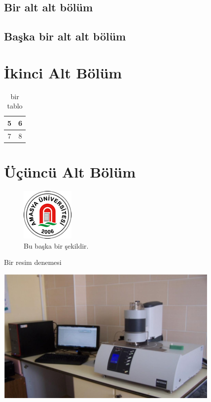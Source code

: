 \documentclass[
oneside, %
doktora, %
]{aufbetez} %
\begin{document}
\subsection{Bir alt alt bölüm}
\lipsum

\subsection{Başka bir alt alt bölüm}
\lipsum

\section{İkinci Alt Bölüm}
\lipsum
\begin{table}[htbp]
	\begin{center}
		\begin{tabular}{|c|c|}
			\hline 
			5 & 6 \\ 
			\hline 
			7 & 8 \\ 
			\hline 
		\end{tabular}
	\end{center}
	\caption{bir tablo\label{tablo-2}}
\end{table}
\section{Üçüncü Alt Bölüm}
\lipsum

\begin{figure}[htbp]
	\centering
	\includegraphics[scale=4.5]{logo}
	\caption{Bu başka bir şekildir.}
	\label{sekil-2}
\end{figure}

\begin{thesispicture}{Bir resim denemesi}
	\begin{center}
		\includegraphics[scale=0.75]{resim}
	\end{center}
\end{thesispicture}
\lipsum[1-3]
\end{document}
